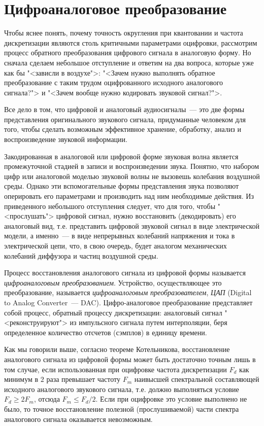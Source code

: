 \documentclass[oneside, final, 14pt]{extreport}
\begin{document}
\section{Цифроаналоговое преобразование}
Чтобы яснее понять, почему точность округления при квантовании и частота дискретизации являются столь критичными параметрами оцифровки, рассмотрим процесс обратного преобразования цифрового сигнала в аналоговую форму. Но сначала сделаем небольшое отступление и ответим на два вопроса, которые уже как бы "<зависли в воздухе">: "<Зачем нужно выполнять обратное преобразование с таким трудом оцифрованного исходного аналогового сигнала?"> и "<Зачем вообще нужно кодировать звуковой сигнал?">.

Все дело в том, что цифровой и аналоговый аудиосигналы~--- это две формы представления оригинального звукового сигнала, придуманные человеком для того, чтобы сделать возможным эффективное хранение, обработку, анализ и воспроизведение звуковой информации. 

Закодированная в аналоговой или цифровой форме звуковая волна является промежуточной стадией в записи и воспроизведении
звука. Понятно, что набором цифр или аналоговой моделью звуковой волны не вызовешь колебания воздушной среды. Однако эти вспомогательные формы представления звука позволяют оперировать его параметрами и производить над ним необходимые действия. Из приведенного небольшого отступления следует, что для того, чтобы "<прослушать"> цифровой сигнал, нужно восстановить (декодировать) его аналоговый вид, т.е. представить цифровой звуковой сигнал в виде электрической модели, а именно~--- в виде непрерывных колебаний напряжения и тока в
электрической цепи, что, в свою очередь, будет аналогом механических колебаний диффузора и частиц воздушной среды.

Процесс восстановления аналогового сигнала из цифровой формы называется \textit{цифроаналоговым преобразованием}. Устройство, осуществляющее это преобразование, называется \textit{цифроаналоговым преобразователем}, \textit{ЦАП} (Digital to Analog Converter~--- DAC). Цифро-аналоговое преобразование представляет собой процесс, обратный процессу дискретизации: аналоговый сигнал "<реконструируют"> из импульсного сигнала путем интерполяции, беря определенное количество отсчетов (сэмплов) в единицу времени.

Как мы говорили выше, согласно теореме Котельникова, восстановление аналогового сигнала из цифровой формы может быть достаточно точным лишь в том случае, если использованная при оцифровке частота дискретизации $F_d$ как минимум в $2$ раза превышает частоту $F_m$ наивысшей спектральной составляющей исходного аналогового звукового сигнала, т.е. должно выполняться условие $F_d\geq2F_m$, отсюда
$F_m\leq F_d/2$. Если при оцифровке это условие выполнено не было, то точное восстановление полезной (прослушиваемой) части спектра аналогового сигнала оказывается невозможным.
\end{document}
